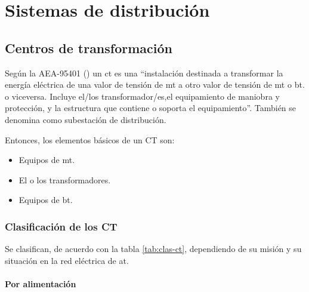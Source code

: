 \chapter{Sistemas de distribución}




\section{Centros de transformación}

Según la AEA-95401 (\cite{aea95401}) un \acrfull{ct} es una ``instalación destinada a transformar la energía eléctrica de una valor de tensión de \acrshort{mt} a otro valor de
tensión de \acrshort{mt} o \acrshort{bt}. o viceversa. Incluye el/los transformador/es,el equipamiento de maniobra y protección, y la estructura que contiene o soporta el equipamiento''. También se denomina como subestación de distribución.


Entonces, los elementos básicos de un CT son:

\begin{itemize}
	\item Equipos de \acrshort{mt}.
	\item El o los transformadores.
	\item Equipos de \acrshort{bt}.
\end{itemize}

\subsection{Clasificación de los CT}

Se clasifican, de acuerdo con la tabla \ref{tab:clas-ct}, dependiendo de su misión y su situación en la red eléctrica de \acrshort{at}.

\subsubsection{Por alimentación}

